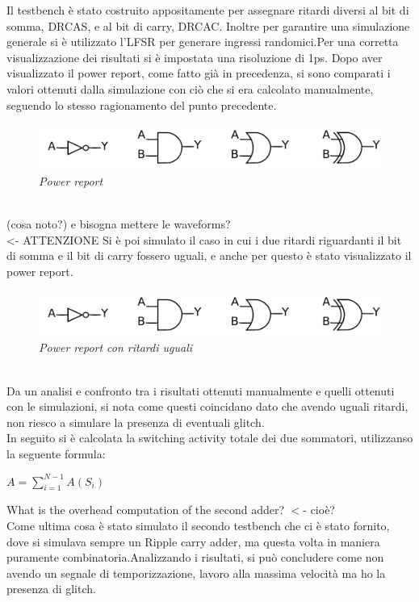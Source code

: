 Il testbench è stato costruito appositamente per assegnare ritardi diversi al bit di somma, DRCAS, e al bit di carry, DRCAC. Inoltre per garantire una simulazione generale si è utilizzato l'LFSR per generare ingressi randomici.Per una corretta visualizzazione dei risultati si è impostata una risoluzione di 1ps. Dopo aver visualizzato il power report, come fatto già in precedenza, si sono comparati i valori ottenuti dalla simulazione con ciò che si era calcolato manualmente, seguendo lo stesso ragionamento del punto precedente.\\
	\begin{figure}[!htb]
		\centering
		\includegraphics[scale=1]{immagini/gate}
		\caption{\textit{Power report}}
		\label{fig1_3}
	\end{figure} \\
	(cosa noto?) e bisogna mettere le waveforms?\\                                <- ATTENZIONE
Si è poi simulato il caso in cui i due ritardi riguardanti il bit di somma e il bit di carry fossero uguali, e anche per questo è stato visualizzato il power report.   
\begin{figure}[!htb]
		\centering
		\includegraphics[scale=1]{immagini/gate}
		\caption{\textit{Power report con ritardi uguali}}
		\label{fig1_4}
	\end{figure} \\
	Da un analisi e confronto tra i risultati ottenuti manualmente e quelli ottenuti con le simulazioni, si nota come questi coincidano dato che avendo uguali ritardi, non riesco a simulare la presenza di eventuali glitch.\\
	In seguito si è calcolata la switching activity totale dei due sommatori, utilizzanso la seguente formula:
	\begin{center}
		$ A=\sum_{i=1}^{N-1}{A(S_i)} $  %
	\end{center}
What is the overhead computation of the second adder?  $<$- cioè? \\
Come ultima cosa è stato simulato il secondo testbench che ci è stato fornito, dove si simulava sempre un Ripple carry adder, ma questa volta in maniera puramente combinatoria.Analizzando i risultati, si può concludere come non avendo un segnale di temporizzazione, lavoro alla massima velocità ma ho la presenza di glitch.

